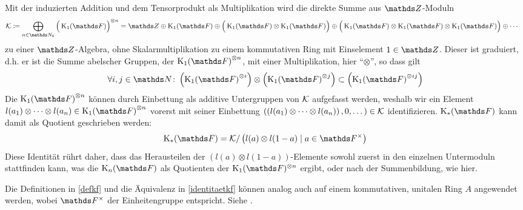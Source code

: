\documentclass[ngerman,fontsize=11pt, paper=a4, parskip=half, titlepage=true, toc=bib]{scrartcl}
\begin{document}
\begin{Bem}\label{identitaetkf}
  Mit der induzierten Addition und dem Tensorprodukt als
  Multiplikation wird die direkte Summe aus $\Z$-Moduln
  \begin{align*}
    \calK &\coloneqq
            \bigoplus_{n\in\N_0}{\Big(\K_1(\F)\Big)}^{\otimes n}%
                = \Z\oplus\K_1(\F)
                \oplus\Big(\K_1(\F)\otimes\K_1(\F)\Big)
                \oplus\Big(\K_1(\F)\otimes\K_1(\F)\otimes\K_1(\F)\Big)
                \oplus\dotsb
  \end{align*}
  zu einer $\Z$-Algebra, 
  ohne Skalarmultiplikation zu einem kommutativen Ring mit Einselement
  $1\in\Z$.
  Dieser ist graduiert, d.h. er ist die Summe abelscher Gruppen, 
  der ${\K_1(\F)}^{\otimes n}$, mit einer Multiplikation, hier
  \enquote{$\otimes$}, so dass gilt
  \begin{gather*}
    \forall i,j\in \N\colon 
    \left( {\K_1(\F)}^{\otimes i} \right) \otimes
    \left( {\K_1(\F)}^{\otimes j} \right)
    \subset \left( {\K_1(\F)}^{\otimes ij} \right)
  \end{gather*}
  Die ${\KoF}^{\otimes n}$ können durch Einbettung als additive 
  Untergruppen von $\mathcal{K}$ aufgefasst
  werden, weshalb wir ein Element
  $l(a_1)\otimes\dotsb\otimes l(a_n)\in {\KoF}^{\otimes n}$
  vorerst mit seiner Einbettung
  $\left(
    \left(l(a_1)\otimes\dotsb\otimes l(a_n)\right),
    0,\dotsc
  \right)\in\mathcal{K}$
  identifizieren.
  $\KF$ kann damit als Quotient geschrieben werden:
  \begin{gather*}
    \KF = \calK / \left(l(a)\otimes l(1-a)\mid a\in\Fx\right)
  \end{gather*}
  Diese Identität rührt daher, dass das Herausteilen 
  der $(l(a)\otimes l(1-a))$-Elemente sowohl zuerst in den einzelnen
  Untermoduln stattfinden kann, was die $\KnF$ als Quotienten der
  $\KoF^{\otimes n}$ ergibt, 
  oder nach der Summenbildung, wie hier.
\end{Bem}

\begin{Bem}
  Die Definitionen in \ref{defkf} und die Äquivalenz in 
  \ref{identitaetkf} können analog auch auf 
  einem kommutativen, unitalen Ring $A$ angewendet werden,
  wobei $\Fx$ der Einheitengruppe entspricht. Siehe \cite{kerzdipl,kerz}.
\end{Bem}
\end{document}
